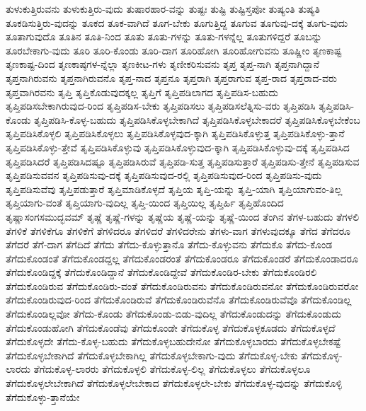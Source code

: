 {ತುಳುಕುತ್ತಿರುವನು
ತುಳುಕುತ್ತಿರು-ವುದು
ತುಷಾರಹಾರ-ವನ್ನು
ತುಷ್ಟಃ
ತುಷ್ಟಿ
ತುಷ್ಟಿಸ್ತಪೋ
ತುಷ್ಯಂತಿ
ತುಷ್ಯತಿ
ತೂಕಡಿಸುತ್ತಿರು-ವುದನ್ನು
ತೂಕದ
ತೂಕ-ವಾಗಿದೆ
ತೂಗ-ಬೇಕು
ತೂಗುತ್ತಿದ್ದ
ತೂಗುವ
ತೂಗುವು-ದಕ್ಕೆ
ತೂಗು-ವುದು
ತೂತಾಗುವುದೊ
ತೂತಿನ
ತೂತಿ-ನಿಂದ
ತೂತು
ತೂತು-ಗಳನ್ನು
ತೂತು-ಗಳನ್ನೆಲ್ಲ
ತೂತುಗಳಿದ್ದರೆ
ತೂಬನ್ನು
ತೂರಬೇಕಾಗು-ವುದು
ತೂರಿ
ತೂರಿ-ಕೊಂಡು
ತೂರಿ-ದಾಗ
ತೂರಿಹೋಗಿ
ತೂರಿಹೋಗುವನು
ತೂಷ್ಣೀಂ
ತೃಣಕಾಷ್ಟ
ತೃಣಕಾಷ್ಟ-ದಿಂದ
ತೃಣಕಾಷ್ಠಗಳ-ನ್ನೆಲ್ಲಾ
ತೃಣಕೀಟ-ಗಳು
ತೃಣೀಕರಿಸುವನು
ತೃಪ್ತ
ತೃಪ್ತ-ನಾಗಿ
ತೃಪ್ತನಾಗಿದ್ದಾನೆ
ತೃಪ್ತನಾಗಿರುವನು
ತೃಪ್ತನಾಗಿರುವನೊ
ತೃಪ್ತ-ನಾದ
ತೃಪ್ತನೂ
ತೃಪ್ತರಾಗಿ
ತೃಪ್ತರಾಗುವ
ತೃಪ್ತ-ರಾದ
ತೃಪ್ತರಾದ-ವರು
ತೃಪ್ತವಾಗಿರವನು
ತೃಪ್ತಿ
ತೃಪ್ತಿಕೊಡುವುದಕ್ಕಲ್ಲ
ತೃಪ್ತಿಗೆ
ತೃಪ್ತಿಪಡಿಲಾಗದ
ತೃಪ್ತಿಪಡಿಸ-ಬಹುದು
ತೃಪ್ತಿಪಡಿಸಬೇಕಾಗಿರುವುದ-ರಿಂದ
ತೃಪ್ತಿಪಡಿಸ-ಬೇಕು
ತೃಪ್ತಿಪಡಿಸಲು
ತೃಪ್ತಿಪಡಿಸಲೆತ್ನಿಸು-ವರು
ತೃಪ್ತಿಪಡಿಸಿ
ತೃಪ್ತಿಪಡಿಸಿ-ಕೊಂಡು
ತೃಪ್ತಿಪಡಿಸಿ-ಕೊಳ್ಳ-ಬಹುದು
ತೃಪ್ತಿಪಡಿಸಿಕೊಳ್ಳಬೇಕಾಗಿದೆ
ತೃಪ್ತಿಪಡಿಸಿಕೊಳ್ಳಬೇಕಾದರೆ
ತೃಪ್ತಿಪಡಿಸಿಕೊಳ್ಳಬೇಕೆಂಬ
ತೃಪ್ತಿಪಡಿಸಿಕೊಳ್ಳಲಿ
ತೃಪ್ತಿಪಡಿಸಿಕೊಳ್ಳಲು
ತೃಪ್ತಿಪಡಿಸಿಕೊಳ್ಳವುದ-ಕ್ಕಾಗಿ
ತೃಪ್ತಿಪಡಿಸಿಕೊಳ್ಳುತ್ತ
ತೃಪ್ತಿಪಡಿಸಿಕೊಳ್ಳು-ತ್ತಾನೆ
ತೃಪ್ತಿಪಡಿಸಿಕೊಳ್ಳು-ತ್ತೇವೆ
ತೃಪ್ತಿಪಡಿಸಿಕೊಳ್ಳುವು
ತೃಪ್ತಿಪಡಿಸಿಕೊಳ್ಳುವುದ-ಕ್ಕಾಗಿ
ತೃಪ್ತಿಪಡಿಸಿಕೊಳ್ಳುವು-ದಕ್ಕೆ
ತೃಪ್ತಿಪಡಿಸಿದ
ತೃಪ್ತಿಪಡಿಸಿದರೆ
ತೃಪ್ತಿಪಡಿಸಿದಷ್ಟೂ
ತೃಪ್ತಿಪಡಿಸಿರುವೆ
ತೃಪ್ತಿಪಡಿ-ಸುತ್ತ
ತೃಪ್ತಿಪಡಿಸುತ್ತಾರೆ
ತೃಪ್ತಿಪಡಿಸು-ತ್ತೇನೆ
ತೃಪ್ತಿಪಡಿಸುವ
ತೃಪ್ತಿಪಡಿಸುವವನ
ತೃಪ್ತಿಪಡಿಸುವು-ದಕ್ಕೆ
ತೃಪ್ತಿಪಡಿಸುವುದ-ರಲ್ಲಿ
ತೃಪ್ತಿಪಡಿಸುವುದ-ರಿಂದ
ತೃಪ್ತಿಪಡಿಸು-ವುದು
ತೃಪ್ತಿಪಡಿಸುವೆವು
ತೃಪ್ತಿಪಡುತ್ತಾರೆ
ತೃಪ್ತಿಮಾಡಿಕೊಳ್ಳದೆ
ತೃಪ್ತಿಯ
ತೃಪ್ತಿ-ಯನ್ನು
ತೃಪ್ತಿ-ಯಾಗಿ
ತೃಪ್ತಿಯಾಗುವಂ-ತಿಲ್ಲ
ತೃಪ್ತಿಯಾಗು-ವಂತೆ
ತೃಪ್ತಿಯಾಗು-ವುದಿಲ್ಲ
ತೃಪ್ತಿ-ಯಿಂದ
ತೃಪ್ತಿಯಿಲ್ಲ
ತೃಪ್ತಿರ್ಹಿ
ತೃಪ್ತಿಹೊಂದಿದ
ತೃಷ್ಣಾಸಂಗಸಮುದ್ಭವಮ್
ತೃಷ್ಣೆ
ತೃಷ್ಣೆ-ಗಳನ್ನು
ತೃಷ್ಣೆಯ
ತೃಷ್ಣೆ-ಯನ್ನು
ತೃಷ್ಣೆ-ಯಿಂದ
ತೆಂಗಿನ
ತೆಗಳ-ಬಹುದು
ತೆಗಳಲಿ
ತೆಗಳಿಕೆ
ತೆಗಳಿಕೆಗೂ
ತೆಗಳಿಕೆಗೆ
ತೆಗಳಿದರೂ
ತೆಗಳಿದರೆ
ತೆಗಳಿದರೇನು
ತೆಗಳು-ವಾಗ
ತೆಗಳುವುದಕ್ಕೂ
ತೆಗೆದ
ತೆಗೆದರೂ
ತೆಗೆದರೆ
ತೆಗೆ-ದಾಗ
ತೆಗೆದಿದೆ
ತೆಗೆದು
ತೆಗೆದು-ಕೊಳ್ಳುತ್ತಾನೊ
ತೆಗೆದು-ಕೊಳ್ಳುವನು
ತೆಗೆದುಕೊ
ತೆಗೆದು-ಕೊಂಡ
ತೆಗೆದುಕೊಂಡಂತೆ
ತೆಗೆದುಕೊಂಡದ್ದಲ್ಲ
ತೆಗೆದುಕೊಂಡರಂತೆ
ತೆಗೆದುಕೊಂಡರೂ
ತೆಗೆದುಕೊಂಡರೆ
ತೆಗೆದುಕೊಂಡಾದರೂ
ತೆಗೆದುಕೊಂಡಿದ್ದಕ್ಕೆ
ತೆಗೆದುಕೊಂಡಿದ್ದಾನೆ
ತೆಗೆದುಕೊಂಡಿದ್ದೇವೆ
ತೆಗೆದುಕೊಂಡಿರ-ಬೇಕು
ತೆಗೆದುಕೊಂಡಿರಲಿ
ತೆಗೆದುಕೊಂಡಿರುವ
ತೆಗೆದುಕೊಂಡಿರು-ವಂತೆ
ತೆಗೆದುಕೊಂಡಿರುವನು
ತೆಗೆದುಕೊಂಡಿರುವನೋ
ತೆಗೆದುಕೊಂಡಿರುವರೋ
ತೆಗೆದುಕೊಂಡಿರುವುದ-ರಿಂದ
ತೆಗೆದುಕೊಂಡಿರುವೆ
ತೆಗೆದುಕೊಂಡಿರುವೆನೊ
ತೆಗೆದುಕೊಂಡಿರುವೆವೊ
ತೆಗೆದುಕೊಂಡಿಲ್ಲ
ತೆಗೆದುಕೊಂಡಿಲ್ಲವೋ
ತೆಗೆದು-ಕೊಂಡು
ತೆಗೆದುಕೊಂಡು-ಬಿಡು-ವುದಿಲ್ಲ
ತೆಗೆದುಕೊಂಡುದನ್ನು
ತೆಗೆದುಕೊಂಡುದು
ತೆಗೆದುಕೊಂಡುಹೋಗಿ
ತೆಗೆದುಕೊಂಡೆವು
ತೆಗೆದುಕೊಂಡೇ
ತೆಗೆದುಕೊಳ್ಳ
ತೆಗೆದುಕೊಳ್ಳಕೂಡದು
ತೆಗೆದುಕೊಳ್ಳದೆ
ತೆಗೆದುಕೊಳ್ಳದೇ
ತೆಗೆದು-ಕೊಳ್ಳ-ಬಹುದು
ತೆಗೆದುಕೊಳ್ಳಬಹುದೇನೋ
ತೆಗೆದುಕೊಳ್ಳಬಾರದು
ತೆಗೆದುಕೊಳ್ಳಬೇಕಷ್ಟೆ
ತೆಗೆದುಕೊಳ್ಳಬೇಕಾಗಿದೆ
ತೆಗೆದುಕೊಳ್ಳಬೇಕಾಗಿಲ್ಲ
ತೆಗೆದುಕೊಳ್ಳಬೇಕಾಗು-ವುದು
ತೆಗೆದುಕೊಳ್ಳ-ಬೇಕು
ತೆಗೆದುಕೊಳ್ಳ-ಲಾರದು
ತೆಗೆದುಕೊಳ್ಳ-ಲಾರರು
ತೆಗೆದುಕೊಳ್ಳಲಿ
ತೆಗೆದುಕೊಳ್ಳ-ಲಿಲ್ಲ
ತೆಗೆದುಕೊಳ್ಳಲು
ತೆಗೆದುಕೊಳ್ಳಲೂ
ತೆಗೆದುಕೊಳ್ಳಲೇಬೇಕಾಗಿದೆ
ತೆಗೆದುಕೊಳ್ಳಲೇಬೇಕಾದ
ತೆಗೆದುಕೊಳ್ಳಲೇ-ಬೇಕು
ತೆಗೆದುಕೊಳ್ಳ-ವುದನ್ನು
ತೆಗೆದುಕೊಳ್ಳಿ
ತೆಗೆದುಕೊಳ್ಳು-ತ್ತಾನೆಯೇ
}
